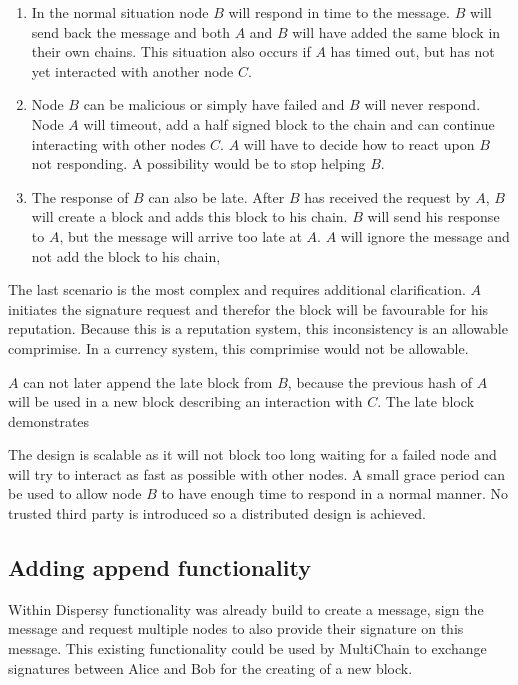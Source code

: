 \begin{enumerate}
\item
In the normal situation node $B$ will respond in time to the message.
$B$ will send back the message
and both $A$ and $B$ will have added the same block in their own chains.
This situation also occurs if $A$ has timed out,
but has not yet interacted with another node $C$.

\item
Node $B$ can be malicious or simply have failed and $B$ will never respond.
Node $A$ will timeout, add a half signed block to the chain and can continue interacting with other nodes $C$.
$A$ will have to decide how to react upon $B$ not responding.
A possibility would be to stop helping $B$.

\item
The response of $B$ can also be late.
After $B$ has received the request by $A$,
$B$ will create a block and adds this block to his chain.
$B$ will send his response to $A$,
but the message will arrive too late at $A$.
$A$ will ignore the message and not add the block to his chain,
\end{enumerate}

The last scenario is the most complex and requires additional clarification.
$A$ initiates the signature request and therefor the block will be favourable for his reputation.
Because this is a reputation system, this inconsistency is an allowable comprimise.
In a currency system, this comprimise would not be allowable.

$A$ can not later append the late block from $B$,
because the previous hash of $A$ will be used in a new block describing an interaction with $C$.
The late block demonstrates 

The design is scalable as it will not block too long waiting for a failed node 
and will try to interact as fast as possible with other nodes.
A small grace period can be used to allow node $B$ to have enough time to respond in a normal manner.
No trusted third party is introduced so a distributed design is achieved.

\subsection{Adding append functionality}
Within Dispersy functionality was already build to create a message, sign the message
and request multiple nodes to also provide their signature on this message.
This existing functionality could be used by MultiChain to exchange signatures
between Alice and Bob for the creating of a new block.

